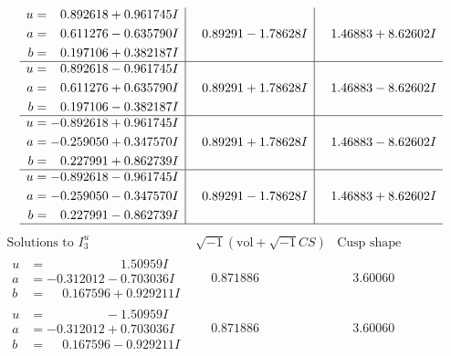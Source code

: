 \documentclass[1p]{elsarticle_modified}
\theoremstyle{definition}
\newcommand{\I}{\sqrt{-1}}
\begin{document}
$$\begin{array}{c|c|c}
\begin{aligned}
u &= \phantom{-}0.892618 + 0.961745 I \\
a &= \phantom{-}0.611276 - 0.635790 I \\
b &= \phantom{-}0.197106 + 0.382187 I\end{aligned}
 & \phantom{-}0.89291 - 1.78628 I & \phantom{-}1.46883 + 8.62602 I \\ \hline\begin{aligned}
u &= \phantom{-}0.892618 - 0.961745 I \\
a &= \phantom{-}0.611276 + 0.635790 I \\
b &= \phantom{-}0.197106 - 0.382187 I\end{aligned}
 & \phantom{-}0.89291 + 1.78628 I & \phantom{-}1.46883 - 8.62602 I \\ \hline\begin{aligned}
u &= -0.892618 + 0.961745 I \\
a &= -0.259050 + 0.347570 I \\
b &= \phantom{-}0.227991 + 0.862739 I\end{aligned}
 & \phantom{-}0.89291 + 1.78628 I & \phantom{-}1.46883 - 8.62602 I \\ \hline\begin{aligned}
u &= -0.892618 - 0.961745 I \\
a &= -0.259050 - 0.347570 I \\
b &= \phantom{-}0.227991 - 0.862739 I\end{aligned}
 & \phantom{-}0.89291 - 1.78628 I & \phantom{-}1.46883 + 8.62602 I\\
 \hline 
 \end{array}$$\newpage$$\begin{array}{c|c|c}  
\text{Solutions to }I^u_{3}& \I (\text{vol} + \sqrt{-1}CS) & \text{Cusp shape}\\
 \hline 
\begin{aligned}
u &= \phantom{-0.000000 -}1.50959 I \\
a &= -0.312012 - 0.703036 I \\
b &= \phantom{-}0.167596 + 0.929211 I\end{aligned}
 & \phantom{-}0.871886\phantom{ +0.000000I} & \phantom{-}3.60060\phantom{ +0.000000I} \\ \hline\begin{aligned}
u &= \phantom{-0.000000 } -1.50959 I \\
a &= -0.312012 + 0.703036 I \\
b &= \phantom{-}0.167596 - 0.929211 I\end{aligned}
 & \phantom{-}0.871886\phantom{ +0.000000I} & \phantom{-}3.60060\phantom{ +0.000000I} \\ \hline\begin{aligned}

\end{aligned}
\end{array}$$
\end{document}
